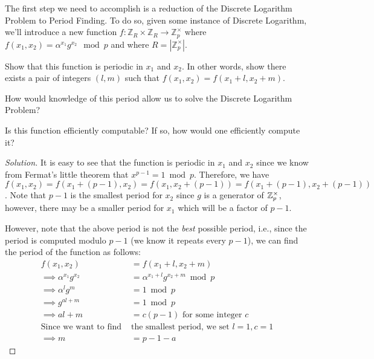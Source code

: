 \begin{solution}[label=ques:4a]
  \begin{question}
    The first step we need to accomplish is a reduction of the Discrete Logarithm Problem to Period Finding. To do so, given some instance of Discrete Logarithm, we'll introduce a new function $f:\mathbb{Z}_R \times \mathbb{Z}_R \rightarrow \mathbb{Z}_p^\times$ where $f(x_1,x_2)= \alpha^{x_1} g^{x_2}\mod p$ and where $R=|\mathbb{Z}_p^\times|$.

\noindent Show that this function is periodic in $x_1$ and $x_2$. In other words, show there exists a pair of integers $(l,m)$ such that $f(x_1,x_2)= f(x_1+l,x_2+m)$. 

\noindent How would knowledge of this period allow us to solve the Discrete Logarithm Problem? 

\noindent Is this function efficiently computable? If so, how would one efficiently compute it?
  \end{question}
  \tcblower{}
  \begin{proof}[Solution]
    It is easy to see that the function is periodic in $x_1$ and $x_2$ since we know from Fermat's little theorem that $x^{p-1} = 1 \bmod p$. Therefore, we have $f(x_1, x_2) = f(x_1 + (p - 1), x_2) = f(x_1, x_2 + (p - 1)) = f(x_1 + (p - 1), x_2 + (p - 1))$. Note that $p-1$ is the smallest period for $x_2$ since $g$ is a generator of $\mathbb{Z}_p^\times$, however, there may be a smaller period for $x_1$ which will be a factor of $p - 1$.\par
    However, note that the above period is not the \textit{best} possible period, i.e., since the period is computed modulo $p - 1$ (we know it repeats every $p - 1$), we can find the period of the function as follows:
    \begin{equation}
      \begin{split}
        f(x_1, x_2) &= f(x_1 + l, x_2 + m)\\
        \implies \alpha^{x_1} g^{x_2} &= \alpha^{x_1 + l} g^{x_2 + m} \bmod p\\
        \implies \alpha^l g^m &= 1 \bmod p\\
        \implies g^{al + m} &= 1 \bmod p\\
        \implies al + m &= c(p - 1)\text{ for some integer $c$}\\
        \text{Since we want to find }&\text{the smallest period, we set }l = 1, c = 1\\
        \implies m &= p - 1 - a
      \end{split}

\end{equation}
\end{proof}
\end{solution}
